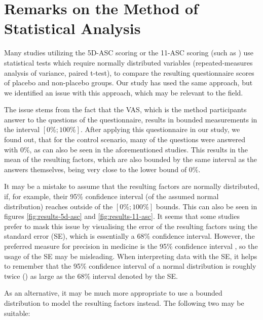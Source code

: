 \chapter{Remarks on the Method of Statistical Analysis}\label{appendix:analysis-remarks}
Many studies utilizing the \ac{5D-ASC} scoring or the \ac{11-ASC} scoring (such as \textcites{carbonaro2018double}{holze2020distinct}{holze2021acute}{hutten2020mood}) use statistical tests which require normally distributed variables (repeated-measures analysis of variance, paired t-test), to compare the resulting questionnaire scores of placebo and non-placebo groups. Our study has used the same approach, but we identified an issue with this approach, which may be relevant to the field.

The issue stems from the fact that the \acf{VAS}, which is the method participants answer to the questions of the questionnaire, results in bounded measurements in the interval $[0\%; 100\%]$. After applying this questionnaire in our study, we found out, that for the control scenario, many of the questions were answered with $0\%$, as can also be seen in the aforementioned studies. This results in the mean of the resulting factors, which are also bounded by the same interval as the answers themselves, being very close to the lower bound of $0\%$.

It may be a mistake to assume that the resulting factors are normally distributed, if, for example, their 95\% confidence interval (of the assumed normal distribution) reaches outside of the $[0\%; 100\%]$ bounds. This can also be seen in figures \ref{fig:results-5d-asc} and \ref{fig:results-11-asc}. It seems that some studies prefer to mask this issue by visualising the error of the resulting factors using the standard error (SE), which is essentially a 68\% confidence interval. However, the preferred measure for precision in medicine is the 95\% confidence interval \autocite{lang2004twenty}, so the usage of the SE may be misleading. When interpreting data with the SE, it helps to remember that the 95\% confidence interval of a normal distribution is roughly twice () as large as the 68\% interval denoted by the SE.

As an alternative, it may be much more appropriate to use a bounded distribution to model the resulting factors instead. The following two may be suitable:

